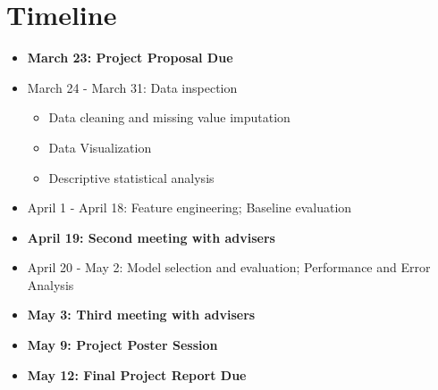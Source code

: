 \documentclass{article}
\begin{document}
	\section{Timeline}
	\begin{itemize}
		\item \textbf{March 23: Project Proposal Due}
		\item March 24 - March 31: Data inspection
		\begin{itemize}
			\item Data cleaning and missing value imputation
			\item Data Visualization
			\item Descriptive statistical analysis
		\end{itemize}
		\item April 1 - April 18: Feature engineering; Baseline evaluation
		\item \textbf{April 19: Second meeting with advisers}
		\item April 20 - May 2: Model selection and evaluation; Performance and Error Analysis
		\item \textbf{May 3: Third meeting with advisers}
		\item \textbf{May 9: Project Poster Session}
		\item \textbf{May 12: Final Project Report Due}
	\end{itemize}
\end{document}
